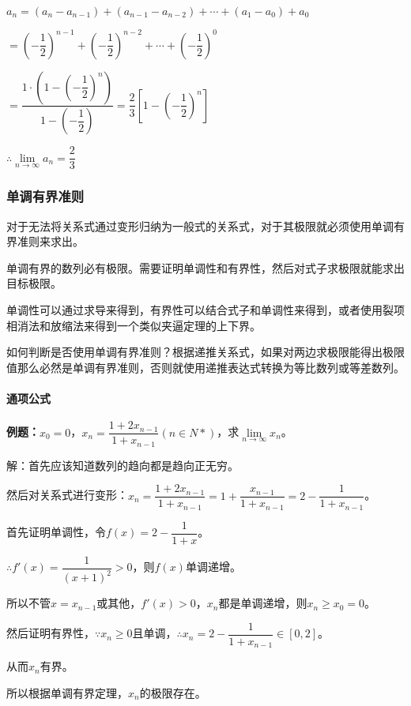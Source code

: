 $a_n=(a_n-a_{n-1})+(a_{n-1}-a_{n-2})+\cdots+(a_1-a_0)+a_0$\medskip

$=\left(-\dfrac{1}{2}\right)^{n-1} + \left(-\dfrac{1}{2}\right)^{n-2} + \cdots + \left(-\dfrac{1}{2}\right)^0$\medskip

$=\dfrac{1\cdot\left(1-\left(-\dfrac{1}{2}\right)^n\right)}{1-\left(-\dfrac{1}{2}\right)}=\dfrac{2}{3}\left[1-\left(-\dfrac{1}{2}\right)^n\right]$\medskip

$\therefore\lim\limits_{n\to\infty}a_n=\dfrac{2}{3}$

\subsubsection{单调有界准则}

对于无法将关系式通过变形归纳为一般式的关系式，对于其极限就必须使用单调有界准则来求出。

单调有界的数列必有极限。需要证明单调性和有界性，然后对式子求极限就能求出目标极限。

单调性可以通过求导来得到，有界性可以结合式子和单调性来得到，或者使用裂项相消法和放缩法来得到一个类似夹逼定理的上下界。

如何判断是否使用单调有界准则？根据递推关系式，如果对两边求极限能得出极限值那么必然是单调有界准则，否则就使用递推表达式转换为等比数列或等差数列。

\paragraph{通项公式} \leavevmode \medskip

\textbf{例题：}$x_0=0$，$x_n=\dfrac{1+2x_{n-1}}{1+x_{n-1}}(n\in N*)$，求$\lim\limits_{n\to\infty}x_n$。\medskip

解：首先应该知道数列的趋向都是趋向正无穷。

然后对关系式进行变形：$x_n=\dfrac{1+2x_{n-1}}{1+x_{n-1}}=1+\dfrac{x_{n-1}}{1+x_{n-1}}=2-\dfrac{1}{1+x_{n-1}}$。

首先证明单调性，令$f(x)=2-\dfrac{1}{1+x}$。

$\therefore f'(x)=\dfrac{1}{(x+1)^2}>0$，则$f(x)$单调递增。

所以不管$x=x_{n-1}$或其他，$f'(x)>0$，$x_n$都是单调递增，则$x_n\geqslant x_0=0$。

然后证明有界性，$\because x_n\geqslant 0$且单调，$\therefore x_n=2-\dfrac{1}{1+x_{n-1}}\in[0,2]$。

从而$x_n$有界。

所以根据单调有界定理，$x_n$的极限存在。


